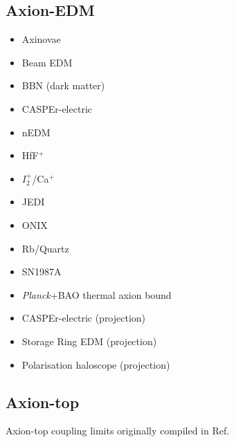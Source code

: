 \documentclass[8pt,twocolumn]{extarticle}
\begin{document}
\begin{mdframed}
\vspace{-1em}
\section{Axion-EDM}\vspace{-0.5em}
\begin{itemize}\setlength\itemsep{-0.5em}
\item Axinovae~\cite{Fox:2023aat}
	\item Beam EDM~\cite{Schulthess:2022pbp}
		\item BBN (dark matter)~\cite{Blum:2014vsa}
	\item CASPEr-electric~\cite{Aybas:2021nvn}
	\item nEDM~\cite{Abel:2017rtm}
	\item HfF$^+$~\cite{Roussy:2020ily}
	\item $I_2^+$/Ca$^+$~\cite{Madge:2024aot}
	\item JEDI~\cite{JEDI:2022hxa}
	\item ONIX~\cite{Fan:2024pxs}
	\item Rb/Quartz~\cite{Zhang:2022ewz}
	\item SN1987A~\cite{Lucente:2022vuo,Springmann:2024ret}
	\item \emph{Planck}+BAO thermal axion bound~\cite{Caloni:2022uya}
	\item CASPEr-electric (projection)~\cite{JacksonKimball:2017elr}	
	\item Storage Ring EDM (projection)~\cite{JacksonKimball:2017elr}	
	\item Polarisation haloscope (projection)~\cite{Berlin:2022mia}
\end{itemize}
\end{mdframed}


\begin{mdframed}
\vspace{-1em}
\section{Axion-top}\vspace{-0.5em}
Axion-top coupling limits originally compiled in Ref.~\cite{Esser:2023fdo,Esser:2024pnc}
\end{mdframed}
\end{document}
